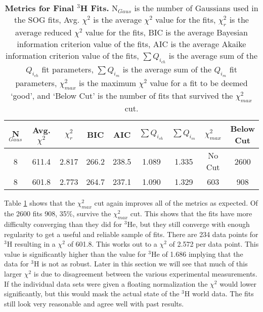 \vspace{6mm}
\begin{table}[!h]
\centering
\begin{tabular}{|c c c c c c c c c|}
\hline
\textbf{N$_{Gaus}$} & \textbf{Avg. $\chi^2$} & \textbf{$\chi^2_r$} & \textbf{BIC} & \textbf{AIC} & \textbf{$\sum Q_{i_{ch}}$} & \textbf{$\sum Q_{i_{m}}$} & \textbf{$\chi^2_{max}$} & \makecell{\textbf{Below}\\ \textbf{Cut}} \\
\hline
8 & 611.4 & 2.817 & 266.2 & 238.5 & 1.089 & 1.335 & No Cut & 2600\\
8 & 601.8 & 2.773 & 264.7 & 237.1 & 1.090 & 1.329 & 603 & 908\\
\hline
\end{tabular}
\caption[Metrics for Final $^3$H Fits]{{\bf{Metrics for Final $^3$H Fits.}} N$_{Gaus}$ is the number of Gaussians used in the SOG fits, Avg. $\chi^2$ is the average $\chi^2$ value for the fits, $\chi^2_r$ is the average reduced $\chi^2$ value for the fits, BIC is the average Bayesian information criterion value of the fits, AIC is the average Akaike information criterion value of the fits, $\sum Q_{i_{ch}}$ is the average sum of the $Q_{i_{ch}}$ fit parameters, $\sum Q_{i_{m}}$ is the average sum of the $Q_{i_{m}}$ fit parameters, $\chi^2_{max}$ is the maximum $\chi^2$ value for a fit to be deemed `good', and `Below Cut' is the number of fits that survived the $\chi^2_{max}$ cut.}
\label{tab:3h_fits}
\end{table}

Table \ref{tab:3h_fits} shows that the $\chi^2_{max}$ cut again improves all of the metrics as expected. Of the 2600 fits 908, 35$\%$, survive the $\chi^2_{max}$ cut. This shows that the fits have more difficulty converging than they did for $^3$He, but they still converge with enough regularity to get a useful and reliable sample of fits. There are 234 data points for $^3$H resulting in a $\chi^2$ of 601.8. This works out to a $\chi^2$ of 2.572 per data point. This value is significantly higher than the value for $^3$He of 1.686 implying that the data for $^3$H is not as robust. Later in this section we will see that much of this larger $\chi^2$ is due to disagreement between the various experimental measurements. If the individual data sets were given a floating normalization the $\chi^2$ would lower significantly, but this would mask the actual state of the $^3$H world data. The fits still look very reasonable and agree well with past results.%

